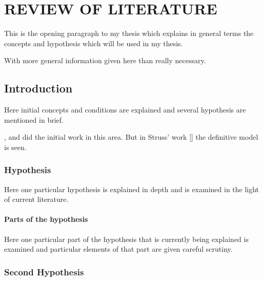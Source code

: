 \chapter{REVIEW OF LITERATURE}

This is the opening paragraph to my thesis which
explains in general terms the concepts and hypothesis
which will be used in my thesis.

With more general information given here than really
necessary.

\section{Introduction}

Here initial concepts and conditions are explained and
several hypothesis are mentioned in brief.

\cite{allen}, \cite{bruner} and \cite{cox}
did the initial work in this area. But in Struss' work [\cite{struss}]
the definitive model is seen.

\subsection{Hypothesis}

Here one particular hypothesis is explained in depth
and is examined in the light of current literature.

\subsubsection{Parts of the hypothesis}

Here one particular part of the hypothesis that is 
currently being explained is examined and particular
elements of that part are given careful scrutiny.


\subsection{Second Hypothesis}

